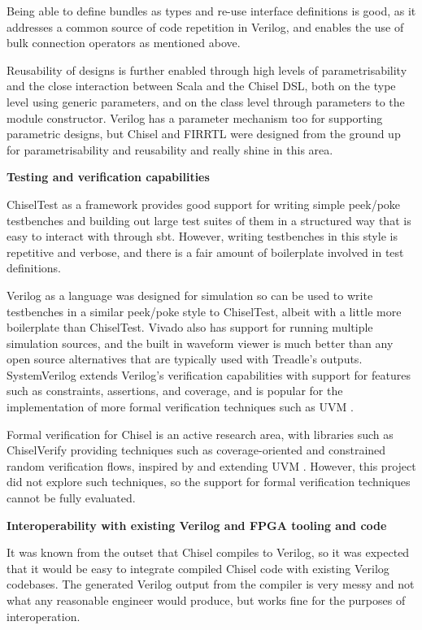 Being able to define bundles as types and re-use interface definitions is good, as it addresses a common source of code repetition in Verilog, and enables the use of bulk connection operators as mentioned above.

Reusability of designs is further enabled through high levels of parametrisability and the close interaction between Scala and the Chisel DSL, both on the type level using generic parameters, and on the class level through parameters to the module constructor. Verilog has a parameter mechanism too for supporting parametric designs, but Chisel and FIRRTL were designed from the ground up for parametrisability and reusability \cite{chisel, firrtl} and really shine in this area.

\textbf{Testing and verification capabilities}

ChiselTest as a framework provides good support for writing simple peek/poke testbenches and building out large test suites of them in a structured way that is easy to interact with through sbt. However, writing testbenches in this style is repetitive and verbose, and there is a fair amount of boilerplate involved in test definitions.

Verilog as a language was designed for simulation so can be used to write testbenches in a similar peek/poke style to ChiselTest, albeit with a little more boilerplate than ChiselTest. Vivado also has support for running multiple simulation sources, and the built in waveform viewer is much better than any open source alternatives that are typically used with Treadle's outputs. SystemVerilog extends Verilog's verification capabilities with support for features such as constraints, assertions, and coverage, and is popular for the implementation of more formal verification techniques such as UVM \cite{spear_tumbush_2012,uvm}.

Formal verification for Chisel is an active research area, with libraries such as ChiselVerify providing techniques such as coverage-oriented and constrained random verification flows, inspired by and extending UVM \cite{chiselverify}. However, this project did not explore such techniques, so the support for formal verification techniques cannot be fully evaluated.

\textbf{Interoperability with existing Verilog and FPGA tooling and code}

It was known from the outset that Chisel compiles to Verilog, so it was expected that it would be easy to integrate compiled Chisel code with existing Verilog codebases. The generated Verilog output from the compiler is very messy and not what any reasonable engineer would produce, but works fine for the purposes of interoperation.

